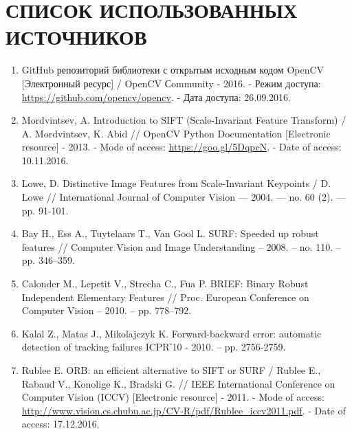 \chapter*{СПИСОК ИСПОЛЬЗОВАННЫХ ИСТОЧНИКОВ}

\begin{enumerate}
    \item \label{itm:opencv} GitHub репозиторий библиотеки с открытым исходным кодом OpenCV [Электронный ресурс] / OpenCV Сommunity - 2016. - Режим доступа: \url{https://github.com/opencv/opencv}. - Дата доступа: 26.09.2016.

    \item \label{itm:sift} Mordvintsev, A. Introduction to SIFT (Scale-Invariant Feature Transform) / A. Mordvintsev, K. Abid // OpenCV Python Documentation [Electronic resource] - 2013. - Mode of access: \url{https://goo.gl/5DqpcN}. - Date of access: 10.11.2016.

    \item \label{itm:lowe} Lowe, D. Distinctive Image Features from Scale-Invariant Keypoints / D. Lowe // International Journal of Computer Vision — 2004. — no. 60 (2). — pp. 91-101.

    \item \label{itm:surf} Bay H., Ess A., Tuytelaars T., Van Gool L. SURF: Speeded up robust features // Computer Vision and Image Understanding – 2008. – no. 110. – pp. 346–359.

    \item \label{itm:brief} Calonder M., Lepetit V., Strecha C., Fua P. BRIEF: Binary Robust Independent Elementary Features // Proc. European Conference on Computer Vision – 2010. – pp. 778–792.

    \item \label{itm:gloh} Kalal Z., Matas J., Mikolajczyk K. Forward-backward error: automatic detection of tracking failures ICPR’10 - 2010. – pp. 2756-2759.

    \item \label{itm:orb} Rublee E. ORB: an efficient alternative to SIFT or SURF / Rublee E., Rabaud V., Konolige K., Bradski G. // IEEE International Conference on Computer Vision (ICCV) [Electronic resource] - 2011. - Mode of access: \url{http://www.vision.cs.chubu.ac.jp/CV-R/pdf/Rublee_iccv2011.pdf}. - Date of access: 17.12.2016.



\end{enumerate}
